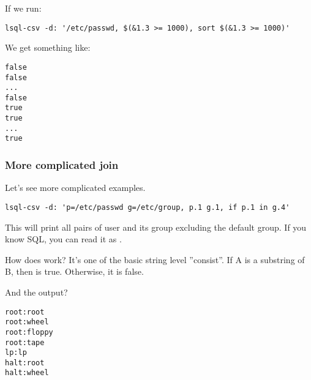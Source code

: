 If we run:
\begin{verbatim}
lsql-csv -d: '/etc/passwd, $(&1.3 >= 1000), sort $(&1.3 >= 1000)'
\end{verbatim}

We get something like:
\begin{verbatim}
false
false
...
false
true
true
...
true
\end{verbatim}

\subsubsection{More complicated join}
Let's see more complicated examples.
\begin{verbatim}
lsql-csv -d: 'p=/etc/passwd g=/etc/group, p.1 g.1, if p.1 in g.4'
\end{verbatim}
This will print all pairs of user and its group excluding the default group. If you know SQL, you can read it as .

How does  work? It's one of the basic string level ''consist''. If A is a substring of B, then  is true. Otherwise, it is false.

And the output?
\begin{verbatim}
root:root                                                                                                                                                                                                                                                                 
root:wheel                                                                                                                                                                                                                                                                
root:floppy                                                                                                                                                                                                                                                               
root:tape                                                                                                                                                                                                                                                                 
lp:lp                                                                                                                                                                                                                                                                     
halt:root                                                                                                                                                                                                                                                                 
halt:wheel 
\end{verbatim}

